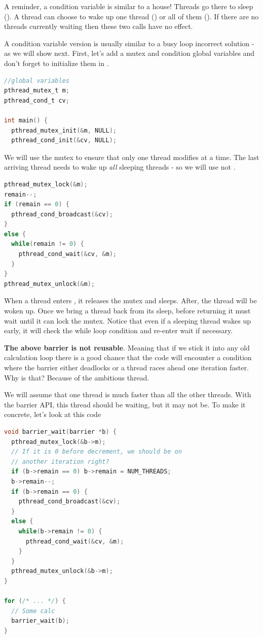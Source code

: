 A reminder, a condition variable is similar to a house! Threads go there to sleep ().
A thread can choose to wake up one thread () or all of them ().
If there are no threads currently waiting then these two calls have no effect.

A condition variable version is usually similar to a busy loop incorrect solution - as we will show next.
First, let's add a mutex and condition global variables and don't forget to initialize them in .

\begin{lstlisting}[language=C]
//global variables
pthread_mutex_t m;
pthread_cond_t cv;

int main() {
  pthread_mutex_init(&m, NULL);
  pthread_cond_init(&cv, NULL);
\end{lstlisting}

We will use the mutex to ensure that only one thread modifies  at a time.
The last arriving thread needs to wake up \emph{all} sleeping threads - so we will use  not .

\begin{lstlisting}[language=C]
pthread_mutex_lock(&m);
remain--;
if (remain == 0) {
  pthread_cond_broadcast(&cv);
}
else {
  while(remain != 0) {
    pthread_cond_wait(&cv, &m);
  }
}
pthread_mutex_unlock(&m);
\end{lstlisting}

When a thread enters , it releases the mutex and sleeps.
After, the thread will be woken up.
Once we bring a thread back from its sleep, before returning it must wait until it can lock the mutex.
Notice that even if a sleeping thread wakes up early, it will check the while loop condition and re-enter wait if necessary.

\textbf{The above barrier is not reusable}.
Meaning that if we stick it into any old calculation loop there is a good chance that the code will encounter a condition where the barrier either deadlocks or a thread races ahead one iteration faster.
Why is that?
Because of the ambitious thread.

We will assume that one thread is much faster than all the other threads.
With the barrier API, this thread should be waiting, but it may not be.
To make it concrete, let's look at this code

\begin{lstlisting}[language=C]
void barrier_wait(barrier *b) {
  pthread_mutex_lock(&b->m);
  // If it is 0 before decrement, we should be on
  // another iteration right?
  if (b->remain == 0) b->remain = NUM_THREADS;
  b->remain--;
  if (b->remain == 0) {
    pthread_cond_broadcast(&cv);
  }
  else {
    while(b->remain != 0) {
      pthread_cond_wait(&cv, &m);
    }
  }
  pthread_mutex_unlock(&b->m);
}

for (/* ... */) {
  // Some calc
  barrier_wait(b);
}
\end{lstlisting}

